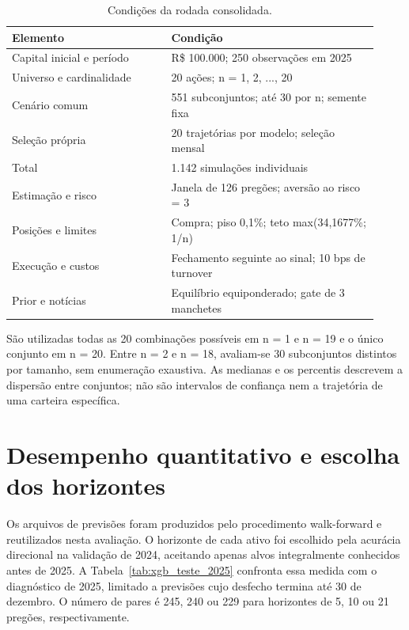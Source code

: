 \begin{table}[H]
\centering
\caption{Condições da rodada consolidada.}
{\footnotesize
\begin{tabular}{p{0.40\linewidth}p{0.52\linewidth}}
\hline
Elemento & Condição \\ \hline
Capital inicial e período & R\$ 100.000; 250 observações em 2025 \\
Universo e cardinalidade & 20 ações; n = 1, 2, ..., 20 \\
Cenário comum & 551 subconjuntos; até 30 por n; semente fixa \\
Seleção própria & 20 trajetórias por modelo; seleção mensal \\
Total & 1.142 simulações individuais \\
Estimação e risco & Janela de 126 pregões; aversão ao risco = 3 \\
Posições e limites & Compra; piso 0,1\%; teto max(34,1677\%; 1/n) \\
Execução e custos & Fechamento seguinte ao sinal; 10 bps de turnover \\
Prior e notícias & Equilíbrio equiponderado; gate de 3 manchetes \\
\hline
\end{tabular}}
\par{}
\end{table}
São utilizadas todas as 20 combinações possíveis em n = 1 e n = 19 e o único conjunto em n = 20. Entre n = 2 e n = 18, avaliam-se 30 subconjuntos distintos por tamanho, sem enumeração exaustiva. As medianas e os percentis descrevem a dispersão entre conjuntos; não são intervalos de confiança nem a trajetória de uma carteira específica.

\section{Desempenho quantitativo e escolha dos horizontes}
Os arquivos de previsões foram produzidos pelo procedimento walk-forward e reutilizados nesta avaliação. O horizonte de cada ativo foi escolhido pela acurácia direcional na validação de 2024, aceitando apenas alvos integralmente conhecidos antes de 2025. A Tabela~\ref{tab:xgb_teste_2025} confronta essa medida com o diagnóstico de 2025, limitado a previsões cujo desfecho termina até 30 de dezembro. O número de pares é 245, 240 ou 229 para horizontes de 5, 10 ou 21 pregões, respectivamente.

